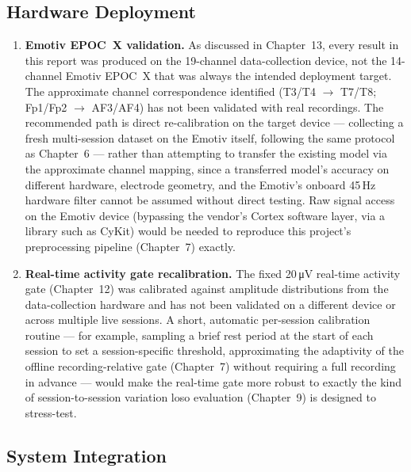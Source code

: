\subsection{Hardware Deployment}

\begin{enumerate}[leftmargin=*]
    \item \textbf{Emotiv EPOC~X validation.} As discussed in
    Chapter~13, every result in this report was produced on the
    19-channel data-collection device, not the 14-channel Emotiv
    EPOC~X that was always the intended deployment target. The
    approximate channel correspondence identified (T3/T4
    $\rightarrow$ T7/T8; Fp1/Fp2 $\rightarrow$ AF3/AF4) has not been
    validated with real recordings. The recommended path is direct
    re-calibration on the target device --- collecting a fresh
    multi-session dataset on the Emotiv itself, following the same
    protocol as Chapter~6 --- rather than attempting to transfer the
    existing model via the approximate channel mapping, since a
    transferred model's accuracy on different hardware, electrode
    geometry, and the Emotiv's onboard 45\,Hz hardware filter cannot
    be assumed without direct testing. Raw signal access on the
    Emotiv device (bypassing the vendor's Cortex software layer, via
    a library such as CyKit) would be needed to reproduce this
    project's preprocessing pipeline (Chapter~7) exactly.
    \item \textbf{Real-time activity gate recalibration.} The fixed
    20\,\si{\micro\volt} real-time activity gate (Chapter~12) was
    calibrated against amplitude distributions from the
    data-collection hardware and has not been validated on a
    different device or across multiple live sessions. A short,
    automatic per-session calibration routine --- for example,
    sampling a brief rest period at the start of each session to set
    a session-specific threshold, approximating the adaptivity of
    the offline recording-relative gate (Chapter~7) without
    requiring a full recording in advance --- would make the
    real-time gate more robust to exactly the kind of session-to-session
    variation \acrshort{loso} evaluation (Chapter~9) is designed to
    stress-test.
\end{enumerate}

\subsection{System Integration}

